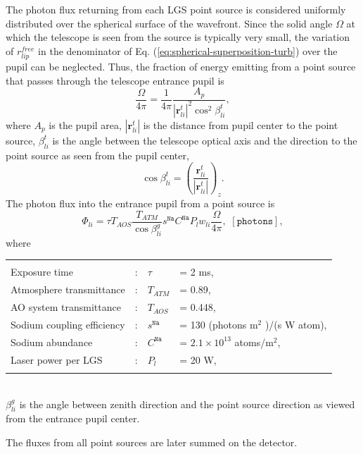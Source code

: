 The photon flux returning from each LGS point source is considered uniformly
distributed over the spherical surface of the wavefront. Since the solid angle
$\Omega$ at which the telescope is seen from the source is typically very
small, the variation of $r^{free}_{lip}$ in the denominator of Eq.
(\ref{eq:spherical-superposition-turb}) over the pupil can be neglected. Thus,
the fraction of energy emitting from a point source that passes through the
telescope entrance pupil is
\begin{equation} \label{eq:energy-fraction}
	\frac{\Omega}{4 \pi} = \frac{1}{4 \pi}
	\frac{ A_{p} }
	     { |\bm{r}^{t}_{li}|^{2} \cos^{2} \beta^{t}_{li} },
\end{equation}
where $A_{p}$ is the pupil area, $|\bm{r}^{t}_{li}|$ is the distance from
pupil center to the point source, $\beta^{t}_{li}$ is the angle between the
telescope optical axis and the direction to the point source as seen from the
pupil center,
\begin{equation} \label{eq:angle-to-source}
	\cos \beta^{t}_{li} = \left( \frac{\bm{r}^{t}_{li}}
	                                  {|\bm{r}^{t}_{li}|} \right)_{z}.
\end{equation}
The photon flux into the entrance pupil from a point source is
\begin{equation} \label{eq:return-flux}
	\Phi_{li} = \tau T_{AOS} \frac{T_{ATM}}{\cos{\beta^{g}_{li}}}
	            s^{\texttt{Na}} C^{\texttt{Na}}
	            P_{l} w_{li}
	            \frac{\Omega}{4 \pi}, \,\, [\texttt{photons}],
\end{equation}
where \\
\begin{tabular}{lcll}
	&&& \\
  Exposure time & : & $\tau$ & = 2 ms, \\
  Atmosphere transmittance & : & $T_{ATM}$ & = 0.89, \\
  AO system transmittance & : & $T_{AOS}$ & = 0.448, \\
  Sodium coupling efficiency & : & $s^{\texttt{Na}}$ &
  = 130 (photons m$^{2}$ )/(s W atom), \\
  Sodium abundance & : & $C^{\texttt{Na}}$ & = $2.1\times10^{13}$ atoms/m$^2$,\\
	Laser power per LGS & : & $P_{l}$ & = 20 W, \\
	&&& \\
\end{tabular} \\
$\beta^{g}_{li}$ is the angle between zenith direction and the point source
direction as viewed from the entrance pupil center.

The fluxes from all point sources are later summed on the detector.